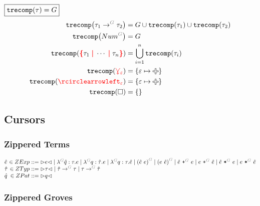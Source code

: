 \noindent $\boxed{\operatorname{\texttt{trecomp}}\mathopen{}\left(\tau\right)\mathclose{} = G}$
%
\begin{align*}
  \trecomp{\tArrow{G}{\tau_1}{\tau_2}}
    &= G \cup \trecomp{\tau_1} \cup \trecomp{\tau_2}
  \\
  \trecomp{\tNum{G}} &= G
  \\
  \trecomp{\conflictHole{\tau_1, \cdots, \tau_n}} &= \bigcup_{i=1}^n \trecomp{\tau_i}
  \\
  \trecomp{\multiVertex{\e}} &= \SetOf{\e \mapsto \Plus}
  \\
  \trecomp{\cycleVertex{\e}} &= \SetOf{\e \mapsto \Plus}
  \\
  \trecomp{\hole} &= \SetOf{}
\end{align*}


\subsection{Cursors}


\subsubsection{Zippered Terms}

\[
  \arraycolsep=0pt
  \begin{array}{lrlll}
    \hat{e} & {}\in ZExp & {}::={} &
      \cursor{e}
      \mid \eFun{G}{\hat{q}}{\tau}{e}
      \mid \eFun{G}{q}{\hat{\tau}}{e}
      \mid \eFun{G}{q}{\tau}{\hat{e}}
      \mid \eApp{G}{\hat{e}}{e}
      \mid \eApp{G}{e}{\hat{e}}
      \mid \ePlus{G}{\hat{e}}{e}
      \mid \ePlus{G}{e}{\hat{e}}
      \mid \eTimes{G}{\hat{e}}{e}
      \mid \eTimes{G}{e}{\hat{e}}
    \\
    \hat{\tau} & {}\in ZTyp & {}::={} &
      \cursor{\tau}
      \mid \tArrow{G}{\hat{\tau}}{\tau}
      \mid \tArrow{G}{\tau}{\hat{\tau}}
    \\
    \hat{q} & {}\in ZPat & {}::={} &
      \cursor{q}
    \\
  \end{array}
\]


\subsubsection{Zippered Groves}

